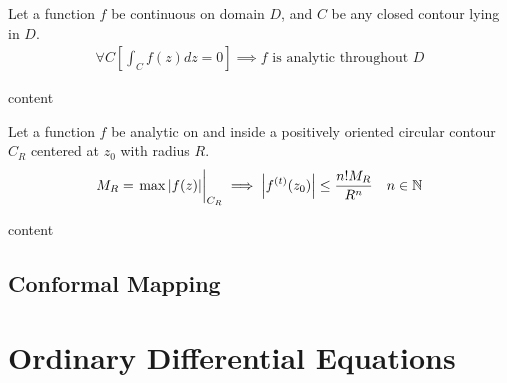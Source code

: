 \documentclass[12pt, english]{book}
\makeatletter
\renewenvironment{proof}[1][\proofname]{\par
	\pushQED{\qed}%
	\normalfont \topsep6\p@\@plus6\p@\relax
	\list{}{%
		\settowidth{\leftmargin}{\itshape\proofname:\hskip\labelsep}%
		\setlength{\labelwidth}{0pt}%
		\setlength{\itemindent}{-\leftmargin}%
	}%
	\item[\hskip\labelsep\itshape#1\@addpunct{:}]\ignorespaces
}{%
	\popQED\endlist\@endpefalse
}
\makeatother
\begin{document}
	\begin{theorem}
		Let a function \(f\) be continuous on domain \(D\), and \(C\) be any closed contour lying in \(D\).
		\begin{align*}
			\forall C \left[\int_{C} f(z) dz = 0 \right]
			\implies f \text{ is analytic throughout } D
		\end{align*}
	\end{theorem}
	\begin{proof}
		content
	\end{proof}

	\begin{theorem}
		Let a function \(f\) be analytic on and inside a positively oriented circular contour \(C_R\) centered at \(z_0\) with radius \(R\). 
		\begin{align*}
			M_R = \eval{\max\abs{f(z)}}_{C_R} &\implies \abs{f^{(t)}(z_0)} \leq \frac{n! M_R}{R^n}
				& n \in \mathbb{N}
		\end{align*}
	\end{theorem}
	\begin{proof}
		content
	\end{proof}
	
	
	
	
	
	
	
	
	
	
	
	
	
	
	
	
	
	
	
	
	
	
	
	
	
	
	
	
	
	
	
	
	
	
	
	
	
	
	
	
	
	
	
	
	
	
	
	
	\chapter{Conformal Mapping} \label{Conformal Mapping Chapter - Complex}
	
	
	
	
	\part{Ordinary Differential Equations} \label{Ordinary Differential Equations Part}
	
\end{document}
